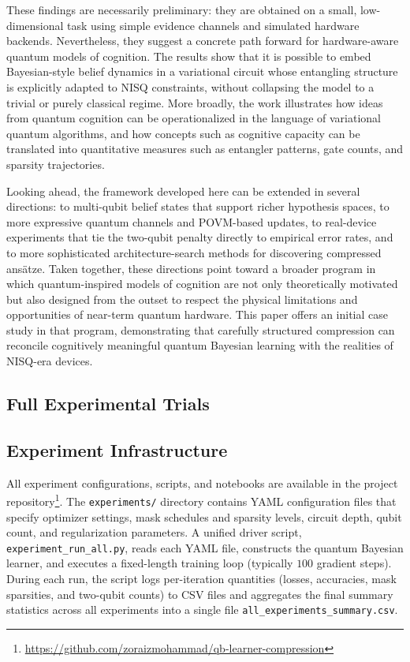 \documentclass[conference]{IEEEtran}
\begin{document}
These findings are necessarily preliminary: they are obtained on a small,
low-dimensional task using simple evidence channels and simulated hardware
backends. Nevertheless, they suggest a concrete path forward for
hardware-aware quantum models of cognition. The results show that it is
possible to embed Bayesian-style belief dynamics in a variational circuit
whose entangling structure is explicitly adapted to NISQ constraints, without
collapsing the model to a trivial or purely classical regime. More broadly,
the work illustrates how ideas from quantum cognition can be operationalized
in the language of variational quantum algorithms, and how concepts such as
cognitive capacity can be translated into quantitative measures such as
entangler patterns, gate counts, and sparsity trajectories.

Looking ahead, the framework developed here can be extended in several
directions: to multi-qubit belief states that support richer hypothesis
spaces, to more expressive quantum channels and POVM-based updates, to
real-device experiments that tie the two-qubit penalty directly to empirical
error rates, and to more sophisticated architecture-search methods for
discovering compressed ansätze. Taken together, these directions point toward
a broader program in which quantum-inspired models of cognition are not only
theoretically motivated but also designed from the outset to respect the
physical limitations and opportunities of near-term quantum hardware. This
paper offers an initial case study in that program, demonstrating that
carefully structured compression can reconcile cognitively meaningful quantum
Bayesian learning with the realities of NISQ-era devices.


\appendix
\subsection*{\textbf{Full Experimental Trials}}
\label{appendix:experimental-trials}

\subsection{Experiment Infrastructure}

All experiment configurations, scripts, and notebooks are available in the project repository\footnote{\url{https://github.com/zoraizmohammad/qb-learner-compression}}. The \texttt{experiments/} directory contains YAML configuration files that specify optimizer settings, mask schedules and sparsity levels, circuit depth, qubit count, and regularization parameters. A unified driver script, \texttt{experiment\_run\_all.py}, reads each YAML file, constructs the quantum Bayesian learner, and executes a fixed-length training loop (typically $100$ gradient steps). During each run, the script logs per-iteration quantities (losses, accuracies, mask sparsities, and two-qubit counts) to CSV files and aggregates the final summary statistics across all experiments into a single file \texttt{all\_experiments\_summary.csv}. 
\end{document}
